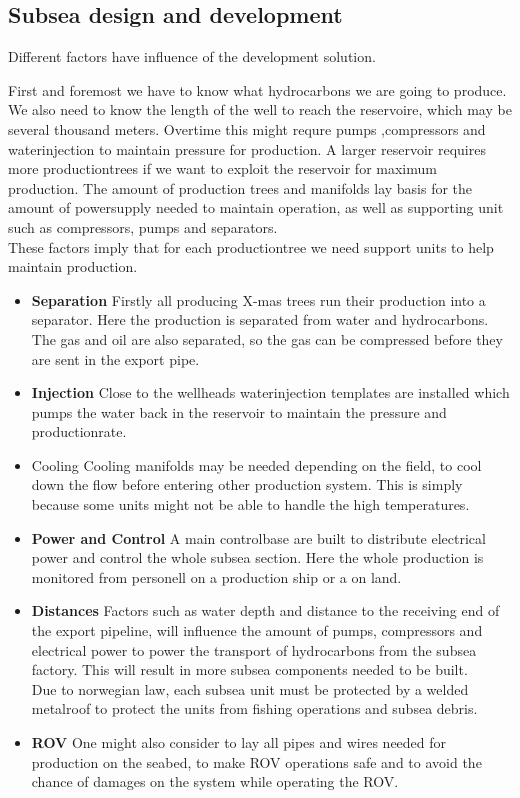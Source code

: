 \documentclass[a4paper,norsk]{article}
\begin{document}
\subsection*{Subsea design and development}
Different factors have influence of the development solution. 

First and foremost we have to know what hydrocarbons we are going to produce. We also need to know the length of the well to reach the reservoire, which may be several thousand meters. Overtime this might requre pumps ,compressors and waterinjection to maintain pressure for production. 
A larger reservoir requires more productiontrees if we want to exploit the reservoir for maximum production. 
The amount of production trees and manifolds lay basis for the amount of powersupply needed to maintain operation, as well as supporting unit such as compressors, pumps and separators. \\


These factors imply that for each productiontree we need support units to help maintain production.
\begin{itemize}

\item \textbf{Separation}
 Firstly all producing X-mas trees run their production into a separator. Here the production is separated from water and hydrocarbons. The gas and oil are also separated, so the gas can be compressed before they are sent in the export pipe.
\item \textbf{Injection}
Close to the wellheads waterinjection templates are installed which pumps the water back in the reservoir to maintain the pressure and productionrate.

\item{Cooling}
Cooling manifolds may be needed depending on the field, to cool down the flow before entering other production system. This is simply because some units might not be able to handle the high temperatures. 

\item \textbf{Power and Control}
A main controlbase are built to distribute electrical power and control the whole subsea section. Here the whole production is monitored from personell on a production ship or a on land. \\
\item \textbf{Distances}
Factors such as water depth and distance to the receiving end of the export pipeline, will influence the amount of pumps, compressors and electrical power to power the transport of hydrocarbons from the subsea factory. This will result in more subsea components needed to be built. \\
Due to norwegian law, each subsea unit must be protected by a 
welded metalroof to protect the units from fishing operations and subsea debris. \\ 
\item \textbf{ROV}
One might also consider to lay all pipes and wires needed for production on the seabed, to make ROV operations safe and to avoid the chance of damages on the system while operating the ROV.
\end{itemize}
\end{document}
